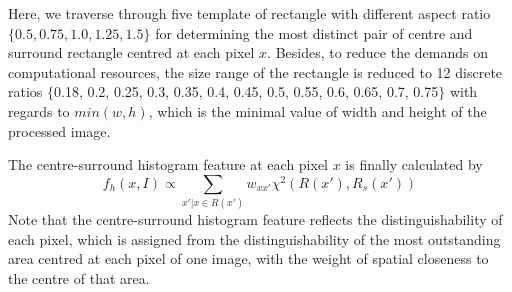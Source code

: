 \documentclass[10pt,twocolumn,letterpaper]{article}
\newcommand{\SUM}{\sum\limits}
\begin{document}
Here, we traverse through five template of rectangle with different aspect ratio $\{ 0.5, 0.75, 1.0, 1.25, 1.5\}$ for determining the most distinct pair of centre and surround rectangle centred at each pixel $x$. Besides, to reduce the demands on computational resources, the size range of the rectangle is reduced to 12 discrete ratios $\{$0.18, 0.2, 0.25, 0.3, 0.35, 0.4, 0.45, 0.5, 0.55, 0.6, 0.65, 0.7, 0.75$\}$ with regards to  $min(w,h)$, which is the minimal value of width and height of the processed image.

The centre-surround histogram feature at each pixel $x$ is finally calculated by $$f_h(x,I)\propto\SUM_{x'|x\in R(x')}w_{xx'}\chi^2(R(x'),R_s(x'))$$
Note that the centre-surround histogram feature reflects the distinguishability of each pixel, which is assigned from the distinguishability of the most outstanding area centred at each pixel of one image, with the weight of spatial closeness to the centre of that area. 
\end{document}
